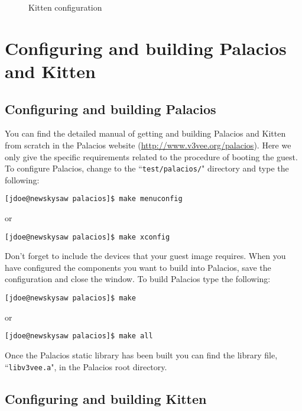 \documentclass{article}[11pt]
\def\colfigsize{\epsfxsize=5in}
\begin{document}
\begin{figure}[ht]
  \begin{center}
    \colfigsize{}
  \end{center}
  \caption{Kitten configuration}
  \label{fig:kittencf2}
\end{figure}


\section{Configuring and building Palacios and Kitten}
\subsection*{Configuring and building Palacios}

You can find the detailed manual of getting and building Palacios and Kitten 
from scratch in the Palacios website (\url{http://www.v3vee.org/palacios}). Here
we only give the specific requirements related to the procedure of booting the
guest. To configure Palacios, change to the ``\verb|test/palacios/|" directory
and type the following:

\begin{verbatim}
[jdoe@newskysaw palacios]$ make menuconfig
\end{verbatim}

\noindent
or

\begin{verbatim}
[jdoe@newskysaw palacios]$ make xconfig
\end{verbatim}

\noindent
Don't forget to include the devices that your guest image requires. When you
have configured the components you want to build into Palacios, save the
configuration and close the window. To build Palacios type the following:

\begin{verbatim}
[jdoe@newskysaw palacios]$ make
\end{verbatim}
or
\begin{verbatim}
[jdoe@newskysaw palacios]$ make all
\end{verbatim}

\noindent
Once the Palacios static library has been built you can find the library file,
``\verb+libv3vee.a+", in the Palacios root directory.

\subsection*{Configuring and building Kitten}
\end{document}
